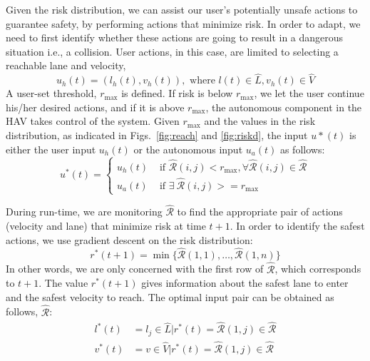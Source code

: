 \documentclass[letterpaper, 10 pt, conference]{ieeeconf}  %
\newcommand\NB[1]{$\spadesuit$\footnote{NB: #1}}
\begin{document}
Given the risk distribution, we can assist our user's potentially unsafe actions to guarantee safety, by performing actions that minimize risk. In order to adapt, we need to first identify whether these actions are going to result in a dangerous situation i.e., a collision. User actions, in this case, are limited to selecting a reachable lane and velocity,
\begin{equation}
u_h(t) = (l_h(t),v_h(t)), \text{ where } l(t)\in\hat{L}, v_h(t)\in\hat{V}
\end{equation}
A user-set threshold, $r_{\max}$ is defined. If risk is below $r_{\max}$, we let the user continue his/her desired actions, and if it is above $r_{\max}$, the autonomous component in the HAV takes control of the system. Given $r_{\max}$ and the values in the risk distribution, as indicated in Figs.~\ref{fig:reach} and \ref{fig:riskd}, the input $u*(t)$ is either the user input $u_h(t)$ or the autonomous input $u_a(t)$ as follows:
\begin{equation} \label{eq:inputctrl}
    u^*(t) = \begin{cases}
    u_h(t) & \text{ if } \hat{\mathcal{R}}(i,j) < r_{\max}, \forall\hat{\mathcal{R}}(i,j)\in\hat{\mathcal{R}} \\
    u_a(t) & \text{ if } \exists~\hat{\mathcal{R}}(i,j) >= r_{\max}
    \end{cases}
\end{equation}
 
During run-time, we are monitoring $\hat{\mathcal{R}}$ to find the appropriate pair of actions (velocity and lane) that minimize risk at time $t+1$. In order to identify the safest actions, we use gradient descent on the risk distribution:
\begin{equation} \label{eq:optpt}
  r^*(t+1) = \min\{\hat{\mathcal{R}}(1,1),\ldots,\hat{\mathcal{R}}(1,n)\}  
\end{equation}
In other words, we are only concerned with the first row of $\hat{\mathcal{R}}$, which corresponds to $t+1$.
The value $r^*(t+1)$ gives information about the safest lane to enter and the safest velocity to reach. The optimal input pair can be obtained as follows, $\hat{\mathcal{R}}$:
\begin{align} \label{eq:optpair}
    l^*(t) &=  l_j\in\hat{L}\vert r^*(t) = \hat{\mathcal{R}}(1,j)\in\hat{\mathcal{R}} \nonumber \\
    v^*(t) &=  v\in\hat{V}\vert r^*(t) = \hat{\mathcal{R}}(1,j)\in\hat{\mathcal{R}}
\end{align}
\end{document}
